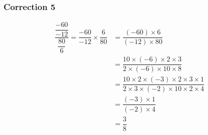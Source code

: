 \documentclass[15pt, mathserif]{beamer}
\begin{document}
\begin{frame}
\vspace{-10mm}
	\frametitle{Correction 5}
	\begin{align*}
	\dfrac{\dfrac{-60}{-12}}{\dfrac{80}{6}}=\dfrac{-60}{-12} \times \dfrac{6}{80}&= \dfrac{\left(-60\right) \times 6}{\left(-12\right) \times 80}\\
		&=\dfrac{10 \times \left(-6\right) \times 2 \times 3}{2 \times \left(-6\right) \times 10 \times 8}\\		&=\dfrac{10 \times 2 \times \left(-3\right) \times 2 \times 3 \times 1}{2 \times 3 \times \left(-2\right) \times 10 \times 2 \times 4}\\		&=\dfrac{\left(-3\right) \times 1}{\left(-2\right) \times 4}\\		&=\dfrac{3}{8}
	\end{align*}\end{frame}
\end{document}
